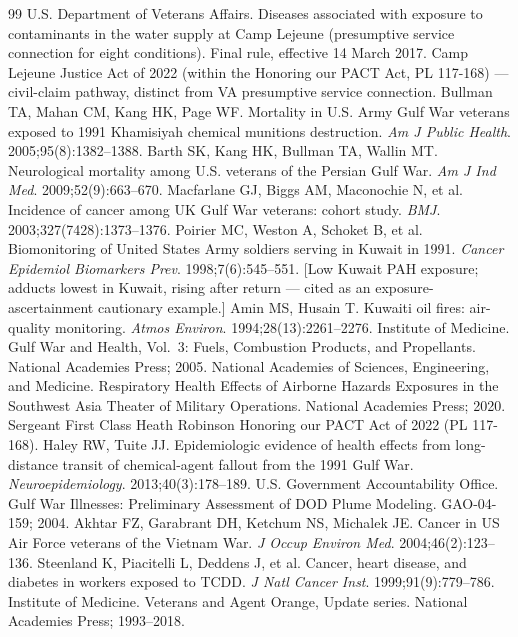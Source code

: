 \documentclass[3p,times]{elsarticle}
\begin{document}
\begin{thebibliography}{99}
 U.S. Department of Veterans Affairs. Diseases associated with exposure to contaminants in the water supply at Camp Lejeune (presumptive service connection for eight conditions). Final rule, effective 14 March 2017.
 Camp Lejeune Justice Act of 2022 (within the Honoring our PACT Act, PL 117-168) --- civil-claim pathway, distinct from VA presumptive service connection.
 Bullman TA, Mahan CM, Kang HK, Page WF. Mortality in U.S. Army Gulf War veterans exposed to 1991 Khamisiyah chemical munitions destruction. \textit{Am J Public Health}. 2005;95(8):1382--1388.
 Barth SK, Kang HK, Bullman TA, Wallin MT. Neurological mortality among U.S. veterans of the Persian Gulf War. \textit{Am J Ind Med}. 2009;52(9):663--670.
 Macfarlane GJ, Biggs AM, Maconochie N, et al. Incidence of cancer among UK Gulf War veterans: cohort study. \textit{BMJ}. 2003;327(7428):1373--1376.
 Poirier MC, Weston A, Schoket B, et al. Biomonitoring of United States Army soldiers serving in Kuwait in 1991. \textit{Cancer Epidemiol Biomarkers Prev}. 1998;7(6):545--551. [Low Kuwait PAH exposure; adducts lowest in Kuwait, rising after return --- cited as an exposure-ascertainment cautionary example.]
 Amin MS, Husain T. Kuwaiti oil fires: air-quality monitoring. \textit{Atmos Environ}. 1994;28(13):2261--2276.
 Institute of Medicine. Gulf War and Health, Vol.\ 3: Fuels, Combustion Products, and Propellants. National Academies Press; 2005.
 National Academies of Sciences, Engineering, and Medicine. Respiratory Health Effects of Airborne Hazards Exposures in the Southwest Asia Theater of Military Operations. National Academies Press; 2020.
 Sergeant First Class Heath Robinson Honoring our PACT Act of 2022 (PL 117-168).
 Haley RW, Tuite JJ. Epidemiologic evidence of health effects from long-distance transit of chemical-agent fallout from the 1991 Gulf War. \textit{Neuroepidemiology}. 2013;40(3):178--189.
 U.S. Government Accountability Office. Gulf War Illnesses: Preliminary Assessment of DOD Plume Modeling. GAO-04-159; 2004.
 Akhtar FZ, Garabrant DH, Ketchum NS, Michalek JE. Cancer in US Air Force veterans of the Vietnam War. \textit{J Occup Environ Med}. 2004;46(2):123--136.
 Steenland K, Piacitelli L, Deddens J, et al. Cancer, heart disease, and diabetes in workers exposed to TCDD. \textit{J Natl Cancer Inst}. 1999;91(9):779--786.
 Institute of Medicine. Veterans and Agent Orange, Update series. National Academies Press; 1993--2018.

\end{thebibliography}
\end{document}
